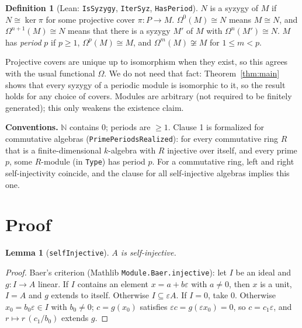 \documentclass[11pt]{article}
\renewcommand{\_}{\oldus\allowbreak}
\newtheorem{lemma}[theorem]{Lemma}
\theoremstyle{definition}
\newtheorem{definition}[theorem]{Definition}
\theoremstyle{remark}
\begin{document}
\begin{definition}[Lean: \texttt{IsSyzygy}, \texttt{IterSyz}, \texttt{HasPeriod}]
$N$ is a syzygy of $M$ if $N\cong\ker\pi$ for some projective cover $\pi:P\to M$.
$\Omega^0(M)\cong N$ means $M\cong N$, and $\Omega^{n+1}(M)\cong N$ means that there is a syzygy
$M'$ of $M$ with $\Omega^n(M')\cong N$. $M$ has \emph{period} $p$ if $p\ge1$,
$\Omega^p(M)\cong M$, and $\Omega^m(M)\not\cong M$ for $1\le m<p$.
\end{definition}
Projective covers are unique up to isomorphism when they exist, so this agrees with the usual
functional $\Omega$. We do not need that fact: Theorem~\ref{thm:main} shows that every syzygy of a
periodic module is isomorphic to it, so the result holds for any choice of covers. Modules are
arbitrary (not required to be finitely generated); this only weakens the existence claim.

\textbf{Conventions.} $\mathbb{N}$ contains $0$; periods are $\ge 1$. Clause 1 is formalized for
commutative algebras (\texttt{PrimePeriodsRealized}): for every commutative ring $R$ that is a
finite-dimensional $k$-algebra with $R$ injective over itself, and every prime $p$, some
$R$-module (in \texttt{Type}) has period $p$. For a commutative ring, left and right
self-injectivity coincide, and the clause for all self-injective algebras implies this one.

\section{Proof}

\begin{lemma}[\texttt{selfInjective}]
$A$ is self-injective.
\end{lemma}
\begin{proof}
Baer's criterion (Mathlib \texttt{Module.Baer.injective}): let $I$ be an ideal and $g:I\to A$
linear. If $I$ contains an element $x=a+b\varepsilon$ with $a\ne0$, then $x$ is a unit, $I=A$ and
$g$ extends to itself. Otherwise $I\subseteq\varepsilon A$. If $I=0$, take $0$. Otherwise
$x_0=b_0\varepsilon\in I$ with $b_0\ne0$; $c=g(x_0)$ satisfies $\varepsilon c=g(\varepsilon x_0)=0$, so
$c=c_1\varepsilon$, and $r\mapsto r\,(c_1/b_0)$ extends $g$.
\end{proof}
\end{document}
